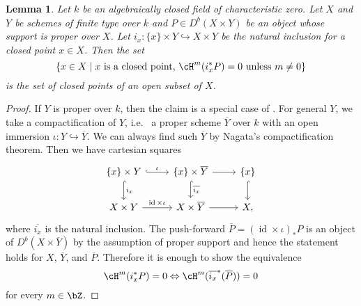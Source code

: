 \documentclass{amsart}
\numberwithin{equation}{section}
\theoremstyle{plain}
\newtheorem{lemma}[theorem]{Lemma}
\theoremstyle{definition}
\DeclareMathOperator{\id}{\mathrm{id}}
\begin{document}
\begin{lemma}\label{lem:degree-is-locally-constant}
    Let $k$ be an algebraically closed field of characteristic zero.
    Let $X$ and $Y$ be schemes of finite type over $k$ and $P \in D^b(X \times Y)$ be an object whose support is proper over $X$.
    Let $i_x \colon \{x\} \times Y \hookrightarrow X \times Y$ be the natural inclusion for a closed point $x \in X$.
    Then the set
    \begin{equation}
        \left\{x \in X \mid x\text{ is a closed point, }\cH^m(i_x^*P) = 0 \text{ unless } m \neq 0\right\}
    \end{equation}
    is the set of closed points of an open subset of $X$.
\end{lemma}
\begin{proof}
    If $Y$ is proper over $k$, then the claim is a special case of \cite[Lemma 3.1.6]{Bridgeland2002FourierMukaiTF}.
    For general $Y$, we take a compactification of $Y$, i.e.~ a proper scheme $\overline{Y}$ over $k$ with an open immersion $\iota \colon Y \hookrightarrow \overline{Y}$.
    We can always find such $\overline{Y}$ by Nagata's compactification theorem.
    Then we have cartesian squares
    \[
        \begin{tikzcd}
            \{x\} \times Y \ar[r, hookrightarrow, "\iota"] \ar[d, hookrightarrow, "i_x"] & \{x\} \times \overline{Y} \ar[r] \ar[d, hookrightarrow, "\overline{i_x}"]& \{x\} \ar[d, hookrightarrow]\\
            X \times Y \ar[r, "\id \times \iota"] & X \times \overline{Y} \ar[r] & X,
        \end{tikzcd}
    \]
    where $\overline{i_x}$ is the natural inclusion.
    The push-forward $\overline{P} = (\id \times \iota)_*P$ is an object of $D^b(X \times \overline{Y})$ by the assumption of proper support and hence the statement holds for $X$, $\overline{Y}$, and $\overline{P}$.
    Therefore it is enough to show the equivalence
    \begin{equation}
        \cH^m(i_x^*P) = 0 \Leftrightarrow \cH^m(\overline{i_x}^*(\overline{P})) = 0
    \end{equation}
    for every $m \in \bZ$.




\end{proof}
\end{document}

